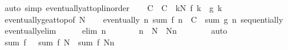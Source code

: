 \begin{isabellebody}
\ {\isacharparenleft}{\kern0pt}auto\ simp{\isacharcolon}{\kern0pt}\ eventually{\isacharunderscore}{\kern0pt}at{\isacharunderscore}{\kern0pt}top{\isacharunderscore}{\kern0pt}linorder{\isacharparenright}{\kern0pt}\isanewline
\ \ \isamarkupfalse%
\ C\ \ {\isachardoublequoteopen}C\ {\isacharequal}{\kern0pt}\ {\isacharparenleft}{\kern0pt}{\isasymSum}k{\isacharless}{\kern0pt}N{\isachardot}{\kern0pt}\ f\ k\ {\isacharminus}{\kern0pt}\ g\ k{\isacharparenright}{\kern0pt}{\isachardoublequoteclose}\isanewline
\ \ \isamarkupfalse%
\ eventually{\isacharunderscore}{\kern0pt}ge{\isacharunderscore}{\kern0pt}at{\isacharunderscore}{\kern0pt}top{\isacharbrackleft}{\kern0pt}of\ N{\isacharbrackright}{\kern0pt}\isanewline
\ \ \isamarkupfalse%
\ {\isachardoublequoteopen}eventually\ {\isacharparenleft}{\kern0pt}{\isasymlambda}n{\isachardot}{\kern0pt}\ sum\ f\ {\isacharbraceleft}{\kern0pt}{\isachardot}{\kern0pt}{\isachardot}{\kern0pt}{\isacharless}{\kern0pt}n{\isacharbraceright}{\kern0pt}\ {\isacharequal}{\kern0pt}\ C\ {\isacharplus}{\kern0pt}\ sum\ g\ {\isacharbraceleft}{\kern0pt}{\isachardot}{\kern0pt}{\isachardot}{\kern0pt}{\isacharless}{\kern0pt}n{\isacharbraceright}{\kern0pt}{\isacharparenright}{\kern0pt}\ sequentially{\isachardoublequoteclose}\isanewline
\ \ \isamarkupfalse%
\ eventually{\isacharunderscore}{\kern0pt}elim\isanewline
\ \ \ \ \isamarkupfalse%
\ {\isacharparenleft}{\kern0pt}elim\ n{\isacharparenright}{\kern0pt}\isanewline
\ \ \ \ \isamarkupfalse%
\ \isamarkupfalse%
\ {\isachardoublequoteopen}{\isacharbraceleft}{\kern0pt}{\isachardot}{\kern0pt}{\isachardot}{\kern0pt}{\isacharless}{\kern0pt}n{\isacharbraceright}{\kern0pt}\ {\isacharequal}{\kern0pt}\ {\isacharbraceleft}{\kern0pt}{\isachardot}{\kern0pt}{\isachardot}{\kern0pt}{\isacharless}{\kern0pt}N{\isacharbraceright}{\kern0pt}\ {\isasymunion}\ {\isacharbraceleft}{\kern0pt}N{\isachardot}{\kern0pt}{\isachardot}{\kern0pt}{\isacharless}{\kern0pt}n{\isacharbraceright}{\kern0pt}{\isachardoublequoteclose}\isanewline
\ \ \ \ \ \ \isamarkupfalse%
\ auto\isanewline
\ \ \ \ \isamarkupfalse%
\ \isamarkupfalse%
\ {\isachardoublequoteopen}sum\ f\ {\isachardot}{\kern0pt}{\isachardot}{\kern0pt}{\isachardot}{\kern0pt}\ {\isacharequal}{\kern0pt}\ sum\ f\ {\isacharbraceleft}{\kern0pt}{\isachardot}{\kern0pt}{\isachardot}{\kern0pt}{\isacharless}{\kern0pt}N{\isacharbraceright}{\kern0pt}\ {\isacharplus}{\kern0pt}\ sum\ f\ {\isacharbraceleft}{\kern0pt}N{\isachardot}{\kern0pt}{\isachardot}{\kern0pt}{\isacharless}{\kern0pt}n{\isacharbraceright}{\kern0pt}{\isachardoublequoteclose}\isanewline

\end{isabellebody}
